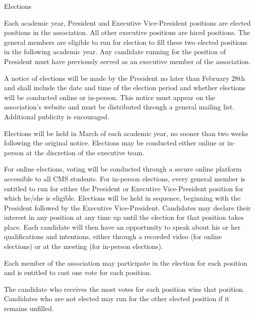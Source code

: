 \documentclass[12pt,a4paper]{article}
\begin{document}
\begin{constitutionlist}
\item Elections

\begin{constitutionlist}
\item Each academic year, President and Executive Vice-President positions are elected positions in the association. All other executive positions are hired positions. The general members are eligible to run for election to fill these two elected positions in the following academic year. Any candidate running for the position of President must have previously served as an executive member of the association.

\item A notice of elections will be made by the President no later than February 28th and shall include the date and time of the election period and whether elections will be conducted online or in-person. This notice must appear on the association's website and must be distributed through a general mailing list. Additional publicity is encouraged.

\item Elections will be held in March of each academic year, no sooner than two weeks following the original notice. Elections may be conducted either online or in-person at the discretion of the executive team.

\item For online elections, voting will be conducted through a secure online platform accessible to all CMS students. For in-person elections, every general member is entitled to run for either the President or Executive Vice-President position for which he/she is eligible. Elections will be held in sequence, beginning with the President followed by the Executive Vice-President. Candidates may declare their interest in any position at any time up until the election for that position takes place.
Each candidate will then have an opportunity to speak about his or her qualifications and intentions, either through a recorded video (for online elections) or at the meeting (for in-person elections).

\item Each member of the association may participate in the election for each position and is entitled to cast one vote for each position.

\item The candidate who receives the most votes for each position wins that position. Candidates who are not elected may run for the other elected position if it remains unfilled.


\end{constitutionlist}
\end{constitutionlist}
\end{document}
